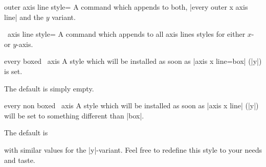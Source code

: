 \begin{pgfplotskey}{outer axis line style=}
    A command which appends  to both,
    |every outer x axis line| and the $y$ variant.
\end{pgfplotskey}

\begin{pgfplotsxykey}{\x\ axis line style=}
    A command which appends  to all axis lines styles for
    either $x$- or $y$-axis.
\end{pgfplotsxykey}

\begin{pgfplotsxykey}{every boxed \x\ axis}
    A style which will be installed as soon as |axis x line=box| (|y|) is set.

    The default is simply empty.
\end{pgfplotsxykey}

\begin{pgfplotsxykey}{every non boxed \x\ axis}
    A style which will be installed as soon as |axis x line| (|y|) will be set
    to something different than |box|.

    The default is
\begin{codeexample}
\end{codeexample}
    \noindent with similar values for the |y|-variant. Feel free to redefine
    this style to your needs and taste.
\end{pgfplotsxykey}

